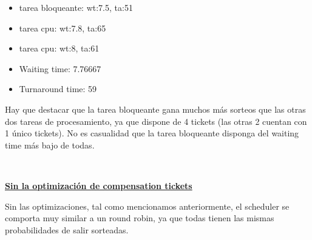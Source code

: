 \begin{itemize}
	\item tarea bloqueante: wt:7.5, ta:51
	\item tarea cpu: wt:7.8, ta:65
	\item tarea cpu: wt:8, ta:61
	\item  Waiting time: 7.76667
	\item  Turnaround time: 59
\end{itemize}

Hay que destacar que la tarea bloqueante gana muchos más sorteos que las otras dos tareas de procesamiento, ya que dispone de 4 tickets (las otras 2 cuentan con 1 único tickets).
No es casualidad que la tarea bloqueante disponga del waiting time más bajo de todas.

~

\textbf{\underline{Sin la optimización de compensation tickets}}

Sin las optimizaciones, tal como mencionamos anteriormente, el scheduler se comporta muy similar a un round robin, ya que todas tienen las mismas probabilidades de salir sorteadas.


